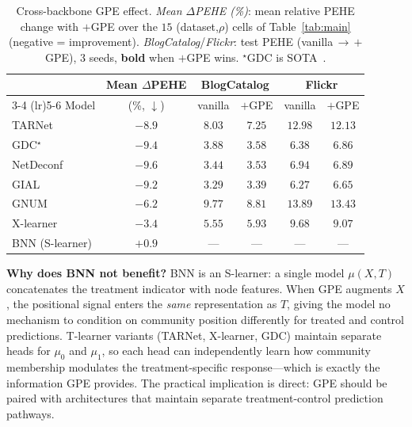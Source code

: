 \documentclass[sigconf,anonymous,review]{acmart}
\begin{document}
\begin{table}[t]
\caption{Cross-backbone GPE effect. \emph{Mean $\Delta$PEHE (\%)}: mean relative PEHE change with $+$GPE over the $15$ (dataset,$\rho$) cells of Table~\ref{tab:main} (negative = improvement). \emph{BlogCatalog}/\emph{Flickr}: test PEHE (vanilla\,$\to$\,$+$GPE), 3 seeds, \textbf{bold} when $+$GPE wins. $^\star$GDC is SOTA~\cite{hu2025gdc}.}
\label{tab:winrate}
\centering
\footnotesize
\setlength{\tabcolsep}{3pt}
\begin{tabular}{@{}l c cc cc@{}}
\toprule
 & Mean $\Delta$PEHE & \multicolumn{2}{c}{BlogCatalog} & \multicolumn{2}{c}{Flickr} \\
\cmidrule(lr){3-4} \cmidrule(lr){5-6}
Model & (\%, $\downarrow$) & vanilla & $+$GPE & vanilla & $+$GPE \\
\midrule
TARNet              & $-8.9$          & $8.03$  & $\mathbf{7.25}$  & $12.98$ & $\mathbf{12.13}$ \\
GDC$^\star$         & $-9.4$          & $3.88$  & $\mathbf{3.58}$  & $\mathbf{6.38}$  & $6.86$  \\
NetDeconf           & $\mathbf{-9.6}$ & $\mathbf{3.44}$  & $3.53$  & $6.94$  & $\mathbf{6.89}$ \\
GIAL                & $-9.2$          & $\mathbf{3.29}$  & $3.39$  & $\mathbf{6.27}$  & $6.65$ \\
GNUM                & $-6.2$          & $9.77$  & $\mathbf{8.81}$  & $13.89$ & $\mathbf{13.43}$ \\
X-learner           & $-3.4$          & $\mathbf{5.55}$  & $5.93$  & $9.68$  & $\mathbf{9.07}$  \\
BNN (S-learner)     & $+0.9$          & ---     & ---     & ---     & --- \\
\bottomrule
\end{tabular}
\end{table}

\textbf{Why does BNN not benefit?} BNN is an S-learner: a single model $\mu(X, T)$ concatenates the treatment indicator with node features. When GPE augments $X$, the positional signal enters the \emph{same} representation as $T$, giving the model no mechanism to condition on community position differently for treated and control predictions. T-learner variants (TARNet, X-learner, GDC) maintain separate heads for $\mu_0$ and $\mu_1$, so each head can independently learn how community membership modulates the treatment-specific response---which is exactly the information GPE provides. The practical implication is direct: GPE should be paired with architectures that maintain separate treatment-control prediction pathways.
\end{document}
